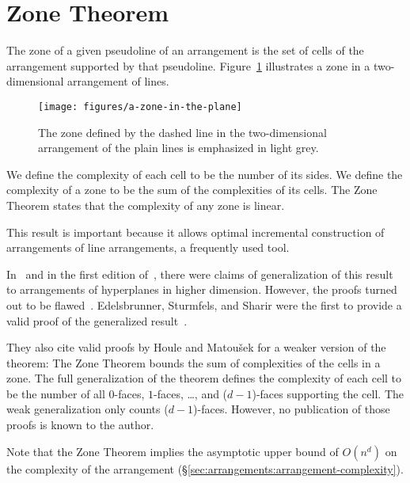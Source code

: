 \section{Zone Theorem}%
\label{sec:arrangements:zone-theorem}

The zone of a given pseudoline of an arrangement is the set of cells of the
arrangement supported by that pseudoline.
%
Figure~\ref{fig:a-zone-in-the-plane} illustrates a zone in a two-dimensional
arrangement of lines.
%
\begin{figure}
  \centering{}
  \texttt{[image: figures/a-zone-in-the-plane]}
  \caption{%
    The zone defined by the dashed line in the two-dimensional
    arrangement of the plain lines is emphasized in light grey.%
  }%
  \label{fig:a-zone-in-the-plane}
\end{figure}

We define the complexity of each cell to be the number of its sides.
We define the complexity of a zone to be the sum of the complexities of its cells.
%
The Zone Theorem states that the complexity of any zone is linear.
%


This result is important because it allows optimal
incremental construction of arrangements of line arrangements, a frequently
used tool.


In~\cite{EOS86} and in the first edition of~\cite{Ed12}, there were claims of
generalization of this result to arrangements of hyperplanes in higher
dimension.
%
However, the proofs turned out to be flawed~\cite{ESS93}.
%
Edelsbrunner, Sturmfels, and Sharir were the first to provide a valid proof of
the generalized result~\cite{ESS93}.
%


They also cite valid proofs by Houle and Matou{\v s}ek for a weaker version of the
theorem:
%
The Zone Theorem bounds the sum of complexities of the cells in a zone.
%
The full generalization of the theorem defines the complexity of each cell to
be the number of all \(0\)-faces, \(1\)-faces, \dots, and (\(d-1\))-faces
supporting the cell.
%
The weak generalization only counts (\(d-1\))-faces.
%
However, no publication of those proofs is known to the author.

Note that the Zone Theorem implies the asymptotic upper bound of \(O(n^d)\)
on the complexity of the arrangement (\S\ref{sec:arrangements:arrangement-complexity}).

